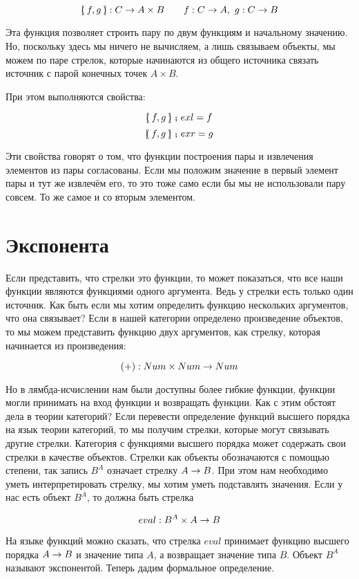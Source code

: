 \[ [\hspace{-2.4pt}(\,f,g\,)\hspace{-2.4pt}] : C \rightarrow A \times B \qquad f : C \rightarrow A,\ g : C \rightarrow B \]

Эта функция позволяет строить пару по двум функциям и начальному
значению. Но, поскольку здесь мы ничего не вычисляем, а лишь связываем
объекты, мы можем по паре стрелок, которые начинаются из общего
источника связать источник с парой конечных точек $A \times B$.

При этом выполняются свойства:

\[ [\hspace{-2.4pt}(\,f,g\,)\hspace{-2.4pt}] \footnotesize\textbf{~;~}\normalsize exl = f \]
\[ [\hspace{-2.4pt}(\,f,g\,)\hspace{-2.4pt}] \footnotesize\textbf{~;~}\normalsize exr = g \]

Эти свойства говорят о том, что функции построения пары
и извлечения элементов из пары согласованы.
Если мы положим значение в первый элемент пары и тут же
извлечём его, то это тоже само если бы мы не
использовали пару совсем. То же самое и со вторым элементом.

\section{Экспонента}

Если представить, что стрелки это функции, то может
показаться, что все наши функции являются функциями
одного аргумента. Ведь у стрелки есть только один
источник. Как быть если мы хотим определить функцию
нескольких аргументов, что она связывает? Если в 
нашей категории определено произведение объектов,
то мы можем представить функцию двух аргументов,
как стрелку, которая начинается из произведения:

\[ (+) : Num \times Num \rightarrow Num \]

Но в лямбда-исчислении нам были доступны более гибкие
функции, функции могли принимать на вход функции и
возвращать функции. Как с этим обстоят дела в теории категорий?
Если перевести определение функций высшего порядка на
язык теории категорий, то мы получим стрелки, которые
могут связывать другие стрелки. Категория с функциями
высшего порядка может содержать свои стрелки в качестве 
объектов. Стрелки как объекты обозначаются с помощью степени,
так запись $B^A$ означает стрелку $A \rightarrow B$. При этом
нам необходимо уметь интерпретировать стрелку,
мы хотим уметь подставлять значения. Если у нас
есть объект $B^A$, то должна быть стрелка

\[ eval : B^A \times A \rightarrow B \]

На языке функций можно сказать, что стрелка $eval$ принимает
функцию высшего порядка $A \rightarrow B$ и значение типа $A$, а
возвращает значение типа $B$. Объект $B^A$ называют 
экспонентой. Теперь дадим формальное определение.

